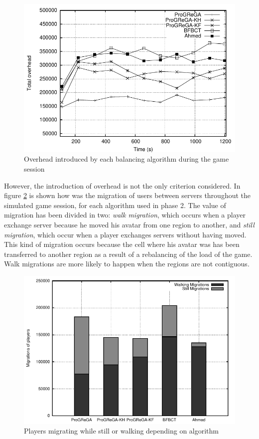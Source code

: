 \begin{figure}[!t]
  \centering
  \includegraphics[width=0.9\linewidth]{images/baloverhead_ah}
  \caption{Overhead introduced by each balancing algorithm during the game session}
  \label{gra:baloverhead}
\end{figure}

However, the introduction of overhead is not the only criterion considered. In figure \ref{gra:balmigxtb} is shown how was the migration of users between servers throughout the simulated game session, for each algorithm used in phase 2. The value of migration has been divided in two: \emph{walk migration}, which occurs when a player exchange server because he moved his avatar from one region to another, and \emph{still migration}, which occur when a player exchanges servers without having moved. This kind of migration occurs because the cell where his avatar was has been transferred to another region as a result of a rebalancing of the load of the game. Walk migrations are more likely to happen when the regions are not contiguous.

\begin{figure}[!t]
  \centering
  \includegraphics[width=0.9\linewidth]{images/balmigxtb_ah}
  \caption{Players migrating while still or walking depending on algorithm}
  \label{gra:balmigxtb}
\end{figure}

